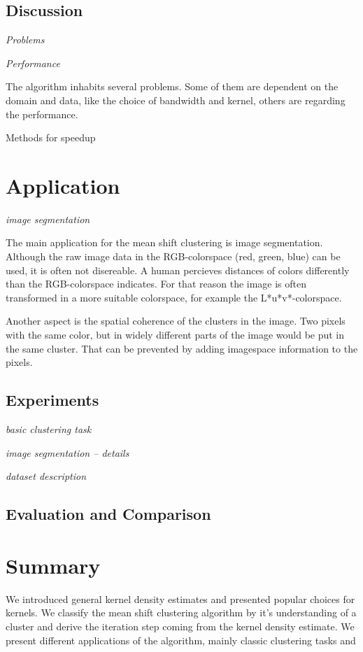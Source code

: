 \documentclass{article}
\begin{document}
\subsection{Discussion}

\textit{Problems}

\textit{Performance}

The algorithm inhabits several problems. Some of them are dependent on the domain and data, like the choice of bandwidth and kernel, others are regarding the performance.

Methods for speedup

\section{Application}

\textit{image segmentation}

The main application for the mean shift clustering is image segmentation. Although the raw image data in the RGB-colorspace (red, green, blue) can be used, it is often not disereable. A human percieves distances of colors differently than the RGB-colorspace indicates. For that reason the image is often transformed in a more suitable colorspace, for example the L*u*v*-colorspace.

Another aspect is the spatial coherence of the clusters in the image. Two pixels with the same color, but in widely different parts of the image would be put in the same cluster. That can be prevented by adding imagespace information to the pixels. 

\subsection{Experiments}

\textit{basic clustering task}

\textit{image segmentation -- details}

\textit{dataset description}

\cite{Alpert.2012}

\subsection{Evaluation and Comparison}

\section{Summary}

We introduced general kernel density estimates and presented popular choices for kernels. We classify the mean shift clustering algorithm by it's understanding of a cluster and derive the iteration step coming from the kernel density estimate. We present different applications of the algorithm, mainly classic clustering tasks and 
\end{document}
